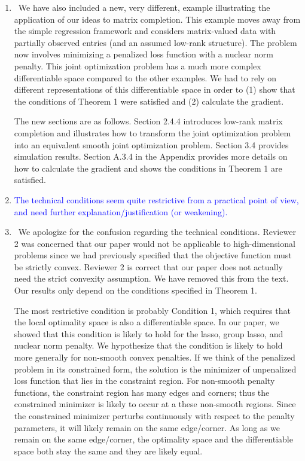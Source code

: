 \documentclass[]{article}
\newcommand{\point}[1]{\item \textcolor{blue}{#1}}
\newcommand{\reply}{\item[]\ }
\begin{document}
\begin{enumerate}
		\reply We have also included a new, very different, example illustrating the application of our ideas to matrix completion. This example moves away from the simple regression framework and considers matrix-valued data with partially observed entries (and an assumed low-rank structure). The problem now involves minimizing a penalized loss function with a nuclear norm penalty. This joint optimization problem has a much more complex differentiable space compared to the other examples. We had to rely on different representations of this differentiable space in order to (1) show that the conditions of Theorem 1 were satisfied and (2) calculate the gradient. 
		
		The new sections are as follows. Section 2.4.4 introduces low-rank matrix completion and illustrates how to transform the joint optimization problem into an equivalent smooth joint optimization problem. Section 3.4 provides simulation results. Section A.3.4 in the Appendix provides more details on how to calculate the gradient and shows the conditions in Theorem 1 are satisfied. 
		
		
		\point{The technical conditions seem quite restrictive from a practical point of view, and need further explanation/justification (or weakening).}
		
		\reply We apologize for the confusion regarding the technical conditions. Reviewer 2 was concerned that our paper would not be applicable to high-dimensional problems since we had previously specified that the objective function must be strictly convex. Reviewer 2 is correct that our paper does not actually need the strict convexity assumption. We have removed this from the text. Our results only depend on the conditions specified in Theorem 1. 
		
		The most restrictive condition is probably Condition 1, which requires that the local optimality space is also a differentiable space. In our paper, we showed that this condition is likely to hold for the lasso, group lasso, and nuclear norm penalty. We hypothesize that the condition is likely to hold more generally for non-smooth convex penalties. If we think of the penalized problem in its constrained form, the solution is the minimizer of unpenalized loss function that lies in the constraint region. For non-smooth penalty functions, the constraint region has many edges and corners; thus the constrained minimizer is likely to occur at a these non-smooth regions. Since the constrained minimizer perturbs continuously with respect to the penalty parameters, it will likely remain on the same edge/corner. As long as we remain on the same edge/corner, the optimality space and the differentiable space both stay the same and they are likely equal.
		

\end{enumerate}
\end{document}

